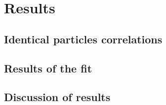 \chapter{Results}
  \section{Identical particles correlations}


  \section{Results of the fit}
  \section{Discussion of results}

